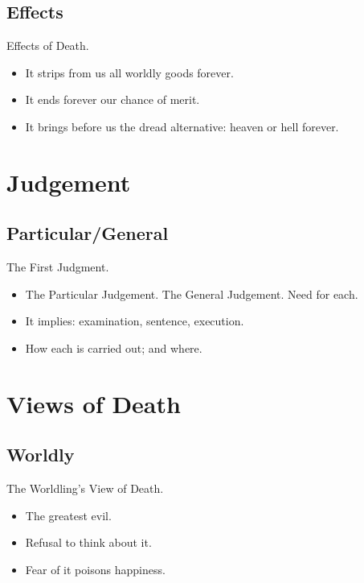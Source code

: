 \documentclass{beamer}
\begin{document}
\subsection{Effects}

\begin{frame}{Effects of Death. }
\begin{itemize}
 \item    It strips from us all worldly goods forever.
 \item    It ends forever our chance of merit.
 \item    It brings before us the dread alternative: heaven or hell forever.
\end{itemize}
\end{frame}

\section{Judgement}

\subsection{Particular/General}

\begin{frame}{The First Judgment.}
\begin{itemize}
 \item    The Particular Judgement. The General Judgement. Need for each.
 \item    It implies: examination, sentence, execution.
 \item    How each is carried out; and where.
\end{itemize}
\end{frame}

\section{Views of Death}

\subsection{Worldly}

\begin{frame}{The Worldling's View of Death.}
\begin{itemize}
 \item    The greatest evil.
 \item    Refusal to think about it.
 \item    Fear of it poisons happiness.
\end{itemize}
\end{frame}
\end{document}
